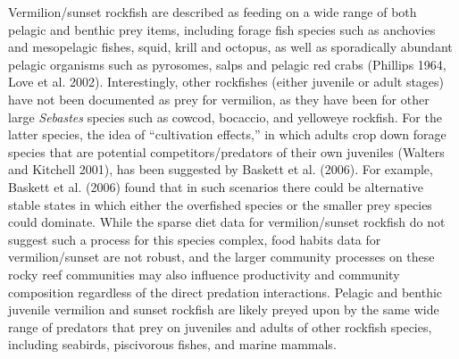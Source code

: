 \documentclass[
  english,
  a4paper,
]{article}
\begin{document}
Vermilion/sunset rockfish are described as feeding on a wide range of both
pelagic and benthic prey items, including forage fish species such as anchovies
and mesopelagic fishes, squid, krill and octopus, as well as sporadically abundant
pelagic organisms such as pyrosomes, salps and pelagic red crabs
(Phillips 1964, Love et al. 2002). Interestingly, other rockfishes (either juvenile or
adult stages) have not been
documented as prey for vermilion, as they have been for other large \emph{Sebastes}
species such as cowcod, bocaccio, and yelloweye rockfish. For the latter species,
the idea of ``cultivation effects,'' in which adults crop down forage species that
are potential competitors/predators of their own juveniles (Walters and Kitchell 2001),
has been suggested by Baskett et al. (2006). For example, Baskett et al. (2006)
found that in such scenarios there could be alternative stable states in which
either the overfished species or the smaller prey species could dominate. While
the sparse diet data for vermilion/sunset rockfish do not suggest such a process
for this species complex, food habits data for vermilion/sunset are not robust,
and the larger community processes on these rocky reef communities may also influence
productivity and community composition regardless of the direct predation interactions.
Pelagic and benthic juvenile vermilion and sunset rockfish are likely preyed upon by
the same wide range of predators that prey on juveniles and adults of other rockfish
species, including seabirds, piscivorous fishes, and marine mammals.
\end{document}
